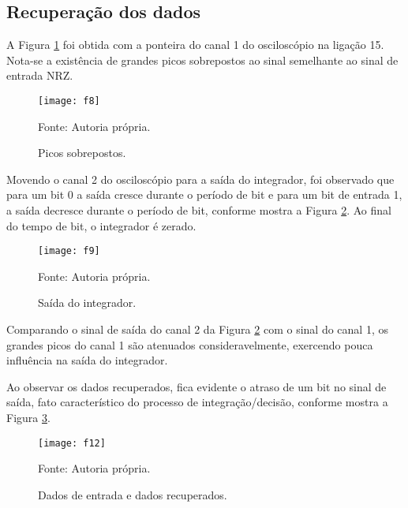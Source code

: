 \subsection{Recuperação dos dados}

	A Figura \ref{fig:f8} foi obtida com a ponteira do canal 1 do osciloscópio na ligação 15. Nota-se a existência de grandes picos sobrepostos ao sinal semelhante ao sinal de entrada NRZ.
	
	\begin{figure}[H]
		\centering
		\caption{Picos sobrepostos.}
		\texttt{[image: f8]}
			
		\small Fonte: Autoria própria.
		\label{fig:f8}
	\end{figure}
		
	Movendo o canal 2 do osciloscópio para a saída do integrador, foi observado que para um bit 0 a saída cresce durante o período de bit e para um bit de entrada 1, a saída decresce
	durante o período de bit, conforme mostra a Figura \ref{fig:f9}. Ao final do tempo de bit, o integrador é zerado.
	
	\begin{figure}[H]
		\centering
		\caption{Saída do integrador.}
		\texttt{[image: f9]}
			
		\small Fonte: Autoria própria.
		\label{fig:f9}
	\end{figure}
	
	Comparando o sinal de saída do canal 2 da Figura \ref{fig:f9} com o sinal do canal 1, os grandes picos do canal 1 são atenuados consideravelmente, exercendo pouca influência na saída do integrador.
	
	Ao observar os dados recuperados, fica evidente o atraso de um bit no sinal de saída, fato característico do processo de integração/decisão, conforme mostra a Figura \ref{fig:f12}.
	
		\begin{figure}[H]
			\centering
			\caption{Dados de entrada e dados recuperados.}
			\texttt{[image: f12]}
			
			\small Fonte: Autoria própria.
			\label{fig:f12}
		\end{figure}


   
